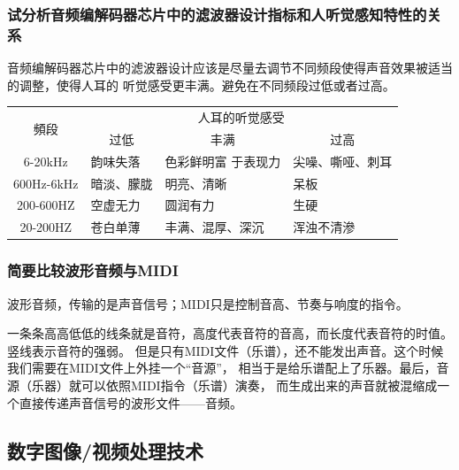 \documentclass[UTF8,a4paper,AutoFakeBold,AutoFakeSlant]{ctexart}
\begin{document}
\subsubsection{试分析音频编解码器芯片中的滤波器设计指标和人听觉感知特性的关系}

音频编解码器芯片中的滤波器设计应该是尽量去调节不同频段使得声音效果被适当的调整，使得人耳的
听觉感受更丰满。避免在不同频段过低或者过高。

\begin{table}[H]
  \centering
    \begin{tabular}{|c|p{5.365em}|p{5.365em}|l|}
    \toprule
    \multirow{2}[4]{*}{頻段} & \multicolumn{3}{c|}{人耳的听觉感受} \\
\cmidrule{2-4}          & \multicolumn{1}{c|}{过低} & \multicolumn{1}{c|}{丰满} & \multicolumn{1}{c|}{过高} \\
    \midrule
    6-20kHz & \multicolumn{1}{l|}{韵味失落} & 色彩鲜明富 于表现力 & \multicolumn{1}{p{5.365em}|}{尖噪、嘶哑、刺耳} \\
    \midrule
    600Hz-6kHz & \multicolumn{1}{l|}{暗淡、朦胧} & \multicolumn{1}{l|}{明亮、清晰} & 呆板 \\
    \midrule
    200-600HZ & \multicolumn{1}{l|}{空虚无力} & \multicolumn{1}{l|}{圆润有力} & 生硬 \\
    \midrule
    20-200HZ & 苍白单薄  & 丰满、混厚、深沉 & 浑浊不清滲 \\
    \bottomrule
    \end{tabular}%
  \label{tab:addlabel}%
\end{table}%


\subsubsection{简要比较波形音频与MIDI}

波形音频，传输的是声音信号；MIDI只是控制音高、节奏与响度的指令。
  
一条条高高低低的线条就是音符，高度代表音符的音高，而长度代表音符的时值。竖线表示音符的强弱。
但是只有MIDI文件（乐谱），还不能发出声音。这个时候我们需要在MIDI文件上外挂一个“音源”，
相当于是给乐谱配上了乐器。最后，音源（乐器）就可以依照MIDI指令（乐谱）演奏，
而生成出来的声音就被混缩成一个直接传递声音信号的波形文件——音频。



\subsection{数字图像/视频处理技术}
\end{document}
